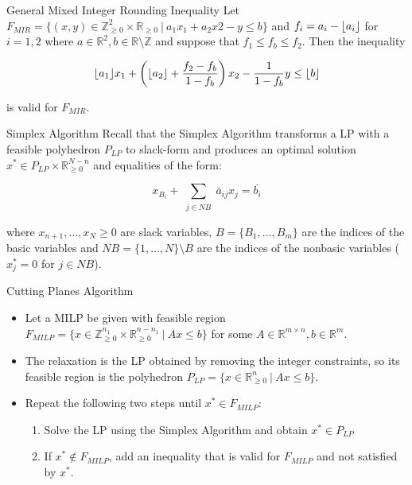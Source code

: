 \begin{frame}{General Mixed Integer Rounding Inequality}
Let $F_{MIR} = \{(x,y) \in \mathbb{Z}_{\geq 0}^2 \times \mathbb{R}_{\geq 0} \:\vert\: a_1x_1+a_2x2-y\leq b \}$ and $f_i=a_i-\lfloor a_i\rfloor$ for $i=1,2$ where $a \in \mathbb{R}^2, b \in \mathbb{R} \setminus \mathbb{Z}$ and suppose that $f_1 \leq f_b \leq f_2$. Then the inequality

\begin{equation*}
\lfloor a_1\rfloor x_1 + \left( \lfloor a_2\rfloor+ \frac{f_2 - f_b}{1 - f_b} \right) x_2 - \frac{1}{1-f_b}y \leq \lfloor b\rfloor
\end{equation*}

is valid for $F_{MIR}$.
\end{frame}

\begin{frame}{Simplex Algorithm}
Recall that the Simplex Algorithm transforms a LP with a feasible polyhedron $P_{LP}$ to slack-form and produces an optimal solution $x^* \in P_{LP} \times \mathbb{R}_{\geq 0}^{N-n}$ and equalities of the form:
\begin{center}
\begin{minipage}{0.8\textwidth}
	\begin{tcolorbox}[colback=white, title={The $i-$th row in the simplex tableau}]
    \begin{equation*}
    	x_{B_i} + \sum\limits_{\substack{j \in NB}} \bar{a}_{ij} x_j = \bar{b_i}
    \end{equation*}
    \end{tcolorbox}
\end{minipage}
\end{center}
where $x_{n+1},...,x_N \geq 0$ are slack variables, $B=\{B_1,...,B_m\}$ are the indices of the basic variables and $NB = \{1,...,N\} \setminus B$ are the indices of the nonbasic variables ($x_j^*=0$ for $j \in NB$).
\end{frame}

\begin{frame}{Cutting Planes Algorithm}
\begin{itemize}
\item Let a MILP be given with feasible region $F_{MILP} = \{x \in \mathbb{Z}_{\geq 0}^{n_1} \times \mathbb{R}_{\geq 0}^{n-n_1} \:\vert\: Ax \leq b \}$ for some $A \in \mathbb{R}^{m \times n}, b \in \mathbb{R}^m$.
\item The relaxation is the LP obtained by removing the integer constraints, so its feasible region is the polyhedron $P_{LP} = \{x \in \mathbb{R}_{\geq 0}^{n} \:\vert\: Ax \leq b \}$.
\item Repeat the following two steps until $x^* \in F_{MILP}$:
\begin{enumerate}
\item Solve the LP using the Simplex Algorithm and obtain $x^* \in P_{LP}$
\item If $x^* \notin F_{MILP}$, add an inequality that is valid for $F_{MILP}$ and not satisfied by $x^*$.
\end{enumerate}
\end{itemize}
\end{frame}

